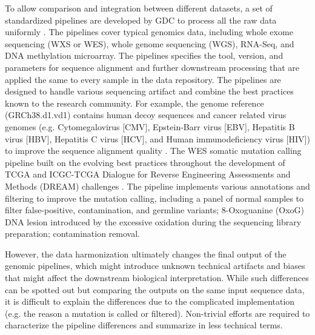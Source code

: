 
To allow comparison and integration between different datasets, a set of standardized pipelines are developed by GDC to process all the raw data uniformly \cite{zhangz_grossmanrl:UniformGenomic2021}. The pipelines cover typical genomics data, including whole exome sequencing (WXS or WES), whole genome sequencing (WGS), RNA-Seq, and DNA methylation microarray. The pipelines specifies the tool, version, and parameters for sequence alignment and further downstream processing that are applied the same to every sample in the data repository. The pipelines are designed to handle various sequencing artifact and combine the best practices known to the research community. For example, the genome reference (GRCh38.d1.vd1) contains human decoy sequences and cancer related virus genomes (e.g. Cytomegalovirus [CMV], Epstein-Barr virus [EBV], Hepatitis B virus [HBV], Hepatitis C virus [HCV], and Human immunodeficiency virus [HIV]) to improve the sequence alignment quality \cite{zhangz_grossmanrl:UniformGenomic2021}. The WES somatic mutation calling pipeline built on the evolving best practices throughout the development of TCGA and ICGC-TCGA Dialogue for Reverse Engineering Assessments and Methods (DREAM) challenges \cite{ewingad_boutrospc:CombiningTumor2015,ellrottk_tcga:MC3MutationCalling2018}. The pipeline implements various annotations and filtering to improve the mutation calling, including a panel of normal samples to filter false-positive, contamination, and germline variants; 8-Oxoguanine (OxoG) DNA lesion introduced by the excessive oxidation during the sequencing library preparation; contamination removal.

However, the data harmonization ultimately changes the final output of the genomic pipelines, which might introduce unknown technical artifacts and biases that might affect the downstream biological interpretation. While such differences can be spotted out but comparing the outputs on the same input sequence data, it is difficult to explain the differences due to the complicated implementation (e.g. the reason a mutation is called or filtered). Non-trivial efforts are required to characterize the pipeline differences and summarize in less technical terms.


